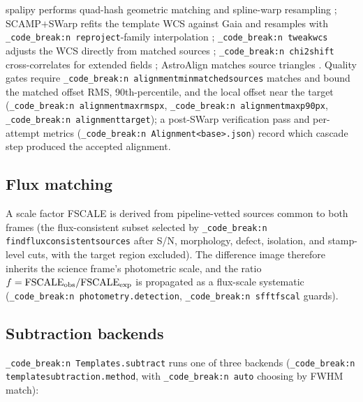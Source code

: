 \documentclass[11pt,a4paper]{article}
\renewcommand{\_}{\autophotunderscore\allowbreak}
\DeclareRobustCommand{\code}[1]{\texttt{\autophot_code_break:n {#1}}}
\begin{document}
spalipy performs quad-hash geometric matching and spline-warp resampling
\citep{spalipy}; SCAMP$+$SWarp refits the template WCS against Gaia and
resamples with \code{reproject}-family interpolation
\citep{bertin2006scamp,bertin2010swarp,robitaille2020reproject};
\code{tweakwcs} adjusts the WCS directly from matched sources
\citep{tweakwcs}; \code{chi2\_shift} cross-correlates for extended fields
\citep{guizar2008efficient}; AstroAlign matches source triangles
\citep{beroiz2020astroalign}. Quality gates require
\code{alignment\_min\_matched\_sources} matches and bound the matched
offset RMS, 90th-percentile, and the local offset near the target
(\code{alignment\_max\_rms\_px}, \code{alignment\_max\_p90\_px},
\code{alignment\_target\_*}); a post-SWarp verification pass and
per-attempt metrics (\code{Alignment\_<base>.json}) record which cascade
step produced the accepted alignment.

\subsection{Flux matching}

A scale factor FSCALE is derived from pipeline-vetted sources common to
both frames (the flux-consistent subset selected by
\code{find\_flux\_consistent\_sources} after S/N, morphology, defect,
isolation, and stamp-level cuts, with the target region excluded). The
difference image therefore inherits the science frame's photometric
scale, and the ratio $f=\mathrm{FSCALE}_{\rm obs}/\mathrm{FSCALE}_{\rm exp}$
is propagated as a flux-scale systematic
(\code{photometry.detection\_*}, \code{sfft\_fscal\_*} guards).

\subsection{Subtraction backends}

\code{Templates.subtract} runs one of three backends
(\code{template\_subtraction.method}, with \code{auto} choosing by FWHM
match):
\end{document}
